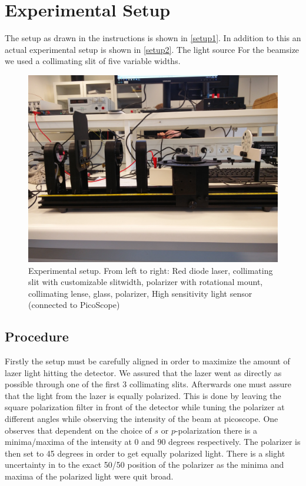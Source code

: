 \section{Experimental Setup}
The setup as drawn in the instructions is shown in \cref{setup1}. In addition to this an actual experimental setup is shown in \cref{setup2}. 
The light source For the beamsize we used a collimating slit of five variable widths.

\begin{figure}[h]
    \centering
    \includegraphics[trim={0 25cm 0 20cm}, clip, width=\columnwidth]{setup}
\caption{Experimental setup. From left to right: Red diode laser, collimating slit with customizable slitwidth, polarizer with rotational mount, collimating lense, glass, polarizer, High sensitivity light sensor (connected to PicoScope)}
    \label{fig:setup}
\end{figure}

\subsection{Procedure}

Firstly the setup must be carefully aligned in order to maximize the amount of lazer light hitting the detector.  We assured that the lazer went as directly as possible through one of the first 3 collimating slits. Afterwards one must assure that the light from the lazer is equally polarized. This is done by leaving the square polarization filter in front of the detector while tuning the polarizer at different angles while observing the intensity of the beam at picoscope. One observes that dependent on the choice of $s$ or $p$-polarization there is a minima/maxima of the intensity at 0 and 90 degrees respectively. The polarizer is then set to 45 degrees in order to get equally polarized light. There is a slight uncertainty in to the exact 50/50 position of the polarizer as the minima and maxima of the polarized light were quit broad.\\

